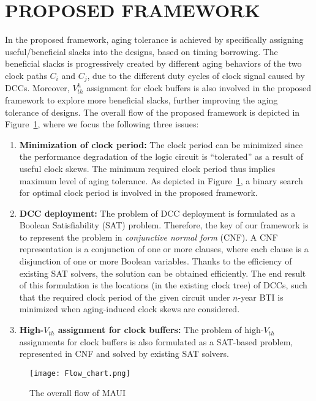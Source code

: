 \section{PROPOSED FRAMEWORK}
\label{sec:framework}
In the proposed framework, aging tolerance is achieved by specifically assigning useful/beneficial slacks into the designs, based on timing borrowing. The beneficial slacks is progressively created by different aging behaviors of the two clock paths $C_{i}$ and $C_{j}$, due to the different duty cycles of clock signal caused by DCCs. Moreover, $V_{th}^h$ assignment for clock buffers is also involved in the proposed framework to explore more beneficial slacks, further improving the aging tolerance of designs.
The overall flow of the proposed framework is depicted in Figure~\ref{fig:flow}, where we focus the following three issues:
\begin{enumerate}[leftmargin=*]
	\item \textbf{Minimization of clock period:} The clock period can be minimized since the performance degradation of the logic circuit is \enquote{tolerated} as a result of useful clock skews. The minimum required clock period thus implies maximum level of aging tolerance. As depicted in Figure~\ref{fig:flow}, a binary search for optimal clock period is involved in the proposed framework.
	\item \textbf{DCC deployment:} The problem of  DCC deployment is formulated as a Boolean Satisfiability (SAT) problem. Therefore, the key of our framework is to represent the problem in \textit{conjunctive normal form} (CNF). A CNF representation is a conjunction of one or more clauses, where each clause is a disjunction of one or more Boolean variables. Thanks to the efficiency of existing SAT solvers, the solution can be obtained efficiently. The end result of this formulation is the locations (in the existing clock tree) of DCCs, such that the required clock period of the given circuit under $n$-year BTI is minimized when aging-induced clock skews are considered. 
	\item \textbf{High-$V_{th}$ assignment for clock buffers:} The problem of high-$V_{th}$ assignments for clock buffers is also formulated as a SAT-based problem, represented in CNF and solved by existing SAT solvers.
\end{enumerate}

\begin{figure}
	\texttt{[image: Flow\_chart.png]} %
	\caption{The overall flow of MAUI}
	\label{fig:flow}
\end{figure}
 


